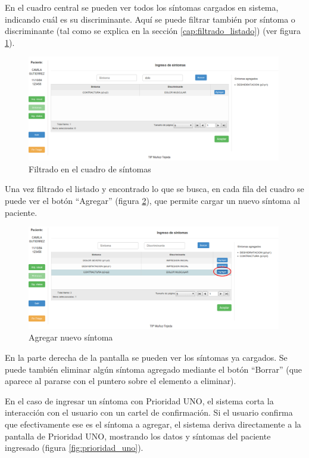 En el cuadro central se pueden ver todos los síntomas cargados en sistema, indicando cuál es su discriminante. Aquí se puede filtrar también por síntoma o discriminante (tal como se explica en la sección \ref{cap:filtrado_listado}) (ver figura \ref{fig:sintomas_filtrar}).
\begin{figure}
\centerline{\includegraphics[width=0.99\textwidth]{sintomas_buscar.png}}
\caption{Filtrado en el cuadro de síntomas} \label{fig:sintomas_filtrar}
\end{figure}
Una vez filtrado el listado y encontrado lo que se busca, en cada fila del cuadro se puede ver el botón ``Agregar'' (figura \ref{fig:sintomas_agregar}), que permite cargar un nuevo síntoma al paciente.
\begin{figure}
\centerline{\includegraphics[width=0.99\textwidth]{sintomas_agregar.png}}
\caption{Agregar nuevo síntoma} \label{fig:sintomas_agregar}
\end{figure}
En la parte derecha de la pantalla se pueden ver los síntomas ya cargados. Se puede también eliminar algún síntoma agregado mediante el botón ``Borrar'' (que aparece al pararse con el puntero sobre el elemento a eliminar).

En el caso de ingresar un síntoma con Prioridad UNO,  el sistema corta la interacción con el usuario con un cartel de confirmación. Si el usuario confirma que efectivamente ese es el síntoma a agregar, el sistema deriva directamente a la pantalla de Prioridad UNO, mostrando los datos y síntomas del paciente ingresado (figura \ref{fig:prioridad_uno}).

